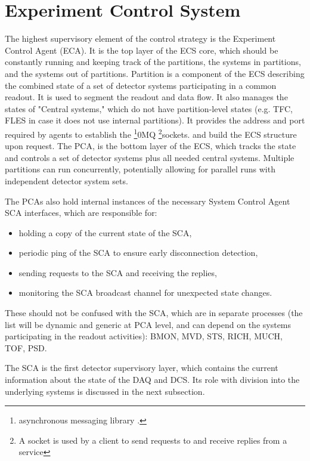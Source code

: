 \section{Experiment Control System}\label{sssAgents}

The highest supervisory element of the control strategy is the Experiment Control Agent (\gls{ECA}). It is the top layer of the \gls{ECS} core, which should be constantly running and keeping track of the  partitions, the systems in partitions, and the systems out of partitions. Partition is a component of the \gls{ECS} describing the combined state of a set of detector systems participating in a common readout. It is used to segment the readout and data flow. It also manages the states of "Central systems," which do not have partition-level states (e.g. \gls{TFC}, \gls{FLES} in case it does not use internal partitions).  It provides the address and port required by agents to establish the \footnote{asynchronous messaging library \cite{zeromq}.}{0MQ} \footnote{A socket is used by a client to send requests to and receive replies from a service}{sockets.} and build the \gls{ECS} structure upon request. The \gls{PCA}, is the bottom layer of the \gls{ECS}, which tracks the state and controls a set of detector systems plus all needed central systems. Multiple partitions can run concurrently, potentially allowing for parallel runs with independent detector system sets. 

The \glspl{PCA} also hold internal instances of the necessary System Control Agent \gls{SCA} interfaces, which are responsible for:
\begin{itemize}
 \item holding a copy of the current state of the \gls{SCA},
 \item periodic ping of the \gls{SCA} to ensure early disconnection detection,
 \item sending requests to the \gls{SCA} and receiving the replies,
 \item monitoring the \gls{SCA} broadcast channel for unexpected state changes.
\end{itemize}

These should not be confused with the \gls{SCA}, which are in separate processes (the list will be dynamic and generic at \gls{PCA} level, and can depend on the systems participating in the readout activities): \gls{BMON}, \gls{MVD}, \gls{STS}, \gls{RICH}, \gls{MUCH}, \gls{TOF}, \gls{PSD}. 

The SCA is the first detector supervisory layer, which contains the current information about the state of the \gls{DAQ} and \gls{DCS}. Its role with division into the underlying systems is discussed in the next subsection.

